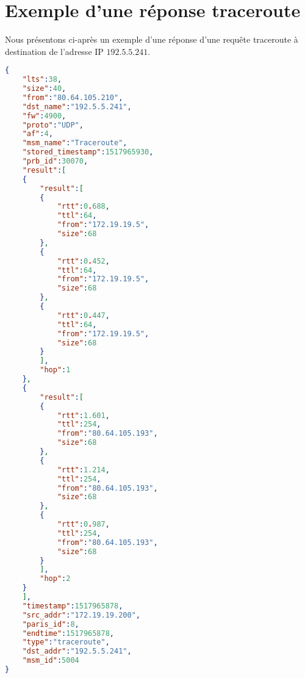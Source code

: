 \chapter{Exemple d'une réponse  traceroute} \label{exemple-traceroute}

Nous présentons ci-après un exemple d'une réponse d'une requête traceroute à destination de l'adresse IP $ 192.5.5.241 $. 

\begin{lstlisting}[language=json,firstnumber=1, caption={Exemple d'une réponse  traceroute}]
{
	"lts":38,
	"size":40,
	"from":"80.64.105.210",
	"dst_name":"192.5.5.241",
	"fw":4900,
	"proto":"UDP",
	"af":4,
	"msm_name":"Traceroute",
	"stored_timestamp":1517965930,
	"prb_id":30070,
	"result":[
	{
		"result":[
		{
			"rtt":0.688,
			"ttl":64,
			"from":"172.19.19.5",
			"size":68
		},
		{
			"rtt":0.452,
			"ttl":64,
			"from":"172.19.19.5",
			"size":68
		},
		{
			"rtt":0.447,
			"ttl":64,
			"from":"172.19.19.5",
			"size":68
		}
		],
		"hop":1
	},
	{
		"result":[
		{
			"rtt":1.601,
			"ttl":254,
			"from":"80.64.105.193",
			"size":68
		},
		{
			"rtt":1.214,
			"ttl":254,
			"from":"80.64.105.193",
			"size":68
		},
		{
			"rtt":0.987,
			"ttl":254,
			"from":"80.64.105.193",
			"size":68
		}
		],
		"hop":2
	}
	],
	"timestamp":1517965878,
	"src_addr":"172.19.19.200",
	"paris_id":8,
	"endtime":1517965878,
	"type":"traceroute",
	"dst_addr":"192.5.5.241",
	"msm_id":5004
}

\end{lstlisting}